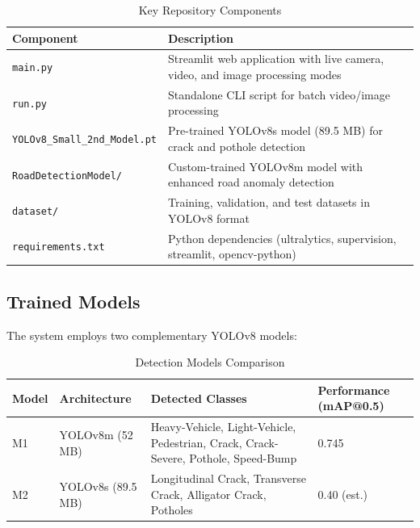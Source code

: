 \documentclass[12pt]{article}
\begin{document}
\begin{table}[H]
    \centering
    \caption{Key Repository Components}
    \label{tab:repo-structure}
    \begin{tabular}{p{}p{}}
        \toprule
        \textbf{Component} & \textbf{Description} \\
        \midrule
        \texttt{main.py} & Streamlit web application with live camera, video, and image processing modes \\
        \texttt{run.py} & Standalone CLI script for batch video/image processing \\
        \texttt{YOLOv8\_Small\_2nd\_Model.pt} & Pre-trained YOLOv8s model (89.5 MB) for crack and pothole detection \\
        \texttt{RoadDetectionModel/} & Custom-trained YOLOv8m model with enhanced road anomaly detection \\
        \texttt{dataset/} & Training, validation, and test datasets in YOLOv8 format \\
        \texttt{requirements.txt} & Python dependencies (ultralytics, supervision, streamlit, opencv-python) \\
        \bottomrule
    \end{tabular}
\end{table}

\subsection{Trained Models}

The system employs two complementary YOLOv8 models:

\begin{table}[H]
    \centering
    \caption{Detection Models Comparison}
    \label{tab:models}
    \begin{tabular}{p{}p{}p{}p{}}
        \toprule
        \textbf{Model} & \textbf{Architecture} & \textbf{Detected Classes} & \textbf{Performance (mAP@0.5)} \\
        \midrule
        M1 & YOLOv8m (52 MB) & Heavy-Vehicle, Light-Vehicle, Pedestrian, Crack, Crack-Severe, Pothole, Speed-Bump & 0.745 \\
        M2 & YOLOv8s (89.5 MB) & Longitudinal Crack, Transverse Crack, Alligator Crack, Potholes & 0.40 (est.) \\
        \bottomrule
    \end{tabular}
\end{table}
\end{document}
